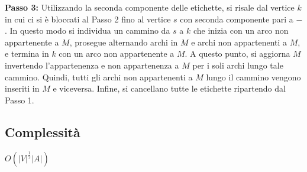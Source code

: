 \textbf{Passo 3:} Utilizzando la seconda componente delle etichette, si risale dal vertice $k$ in cui ci si è bloccati al Passo 2 fino al vertice $s$ con seconda componente pari a $-$. In questo modo si individua un cammino da $s$ a $k$ che inizia con un arco non appartenente a $M$, prosegue alternando archi in $M$ e archi non appartenenti a $M$, e termina in $k$ con un arco non appartenente a $M$. A questo punto, si aggiorna $M$ invertendo l'appartenenza e non appartenenza a $M$ per i soli archi lungo tale cammino. Quindi, tutti gli archi non appartenenti a $M$ lungo il cammino vengono inseriti in $M$ e viceversa. Infine, si cancellano tutte le etichette ripartendo dal Passo 1.

\subsection{Complessità}
$O(|V|^{\frac{1}{2}}|A|)$
